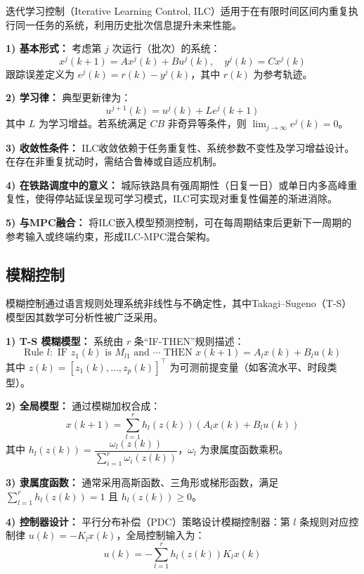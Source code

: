 迭代学习控制（Iterative Learning Control, ILC）适用于在有限时间区间内重复执行同一任务的系统，利用历史批次信息提升未来性能。

\textbf{1) 基本形式：} 考虑第 $j$ 次运行（批次）的系统：
\[
x^j(k+1) = A x^j(k) + B u^j(k), \quad y^j(k) = C x^j(k)
\]
跟踪误差定义为 $e^j(k) = r(k) - y^j(k)$，其中 $r(k)$ 为参考轨迹。

\textbf{2) 学习律：} 典型更新律为：
\begin{equation}\label{eq:ilc_update}
u^{j+1}(k) = u^j(k) + L e^j(k+1)
\end{equation}
其中 $L$ 为学习增益。若系统满足 $CB$ 非奇异等条件，则 $\lim_{j \to \infty} e^j(k) = 0$。

\textbf{3) 收敛性条件：} ILC收敛依赖于任务重复性、系统参数不变性及学习增益设计。在存在非重复扰动时，需结合鲁棒或自适应机制。

\textbf{4) 在铁路调度中的意义：} 城际铁路具有强周期性（日复一日）或单日内多高峰重复性，使得停站延误呈现可学习模式，ILC可实现对重复性偏差的渐进消除。

\textbf{5) 与MPC融合：} 将ILC嵌入模型预测控制，可在每周期结束后更新下一周期的参考输入或终端约束，形成ILC-MPC混合架构。

\subsection{模糊控制}

模糊控制通过语言规则处理系统非线性与不确定性，其中Takagi–Sugeno（T-S）模型因其数学可分析性被广泛采用。

\textbf{1) T-S 模糊模型：} 系统由 $r$ 条“IF-THEN”规则描述：
\[
\text{Rule } l: \text{ IF } z_1(k) \text{ is } M_{l1} \text{ and } \cdots \text{ THEN } x(k+1) = A_l x(k) + B_l u(k)
\]
其中 $z(k) = [z_1(k), \dots, z_p(k)]^\top$ 为可测前提变量（如客流水平、时段类型）。

\textbf{2) 全局模型：} 通过模糊加权合成：
\begin{equation}\label{eq:ts_global}
x(k+1) = \sum_{l=1}^{r} h_l(z(k)) \left( A_l x(k) + B_l u(k) \right)
\end{equation}
其中 $h_l(z(k)) = \dfrac{\omega_l(z(k))}{\sum_{i=1}^r \omega_i(z(k))}$，$\omega_l$ 为隶属度函数乘积。

\textbf{3) 隶属度函数：} 通常采用高斯函数、三角形或梯形函数，满足 $\sum_{l=1}^r h_l(z(k)) = 1$ 且 $h_l(z(k)) \geq 0$。

\textbf{4) 控制器设计：} 平行分布补偿（PDC）策略设计模糊控制器：第 $l$ 条规则对应控制律 $u(k) = -K_l x(k)$，全局控制输入为：
\[
u(k) = -\sum_{l=1}^{r} h_l(z(k)) K_l x(k)
\]

